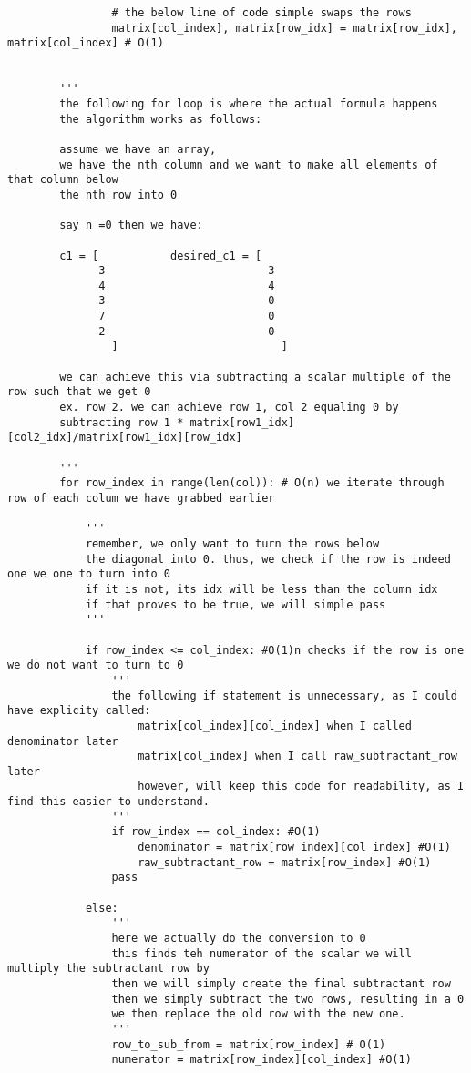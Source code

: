 \documentclass[12pt, a4paper]{article}
\begin{document}
\begin{lstlisting}
                # the below line of code simple swaps the rows
                matrix[col_index], matrix[row_idx] = matrix[row_idx], matrix[col_index] # O(1)


        '''
        the following for loop is where the actual formula happens
        the algorithm works as follows:

        assume we have an array, 
        we have the nth column and we want to make all elements of that column below 
        the nth row into 0

        say n =0 then we have:

        c1 = [           desired_c1 = [
              3                         3
              4                         4
              3                         0
              7                         0
              2                         0
                ]                         ]
        
        we can achieve this via subtracting a scalar multiple of the row such that we get 0
        ex. row 2. we can achieve row 1, col 2 equaling 0 by 
        subtracting row 1 * matrix[row1_idx][col2_idx]/matrix[row1_idx][row_idx]
        
        '''
        for row_index in range(len(col)): # O(n) we iterate through row of each colum we have grabbed earlier

            '''
            remember, we only want to turn the rows below
            the diagonal into 0. thus, we check if the row is indeed one we one to turn into 0
            if it is not, its idx will be less than the column idx
            if that proves to be true, we will simple pass
            '''

            if row_index <= col_index: #O(1)n checks if the row is one we do not want to turn to 0
                '''
                the following if statement is unnecessary, as I could have explicity called:
                    matrix[col_index][col_index] when I called denominator later
                    matrix[col_index] when I call raw_subtractant_row later
                    however, will keep this code for readability, as I find this easier to understand.
                '''
                if row_index == col_index: #O(1)
                    denominator = matrix[row_index][col_index] #O(1)
                    raw_subtractant_row = matrix[row_index] #O(1)
                pass              

            else:
                '''
                here we actually do the conversion to 0
                this finds teh numerator of the scalar we will multiply the subtractant row by
                then we will simply create the final subtractant row
                then we simply subtract the two rows, resulting in a 0
                we then replace the old row with the new one.                
                '''
                row_to_sub_from = matrix[row_index] # O(1)
                numerator = matrix[row_index][col_index] #O(1)



\end{lstlisting}
\end{document}
